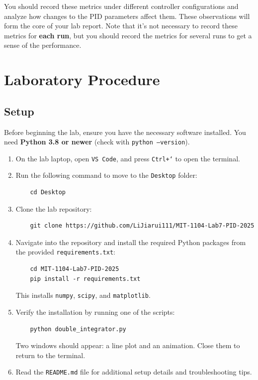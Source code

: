 \documentclass[12pt]{article}
\begin{document}
You should record these metrics under different controller configurations and analyze how changes to the PID parameters affect them.  These observations will form the core of your lab report.  Note that it's not necessary to record these metrics for \textbf{each run}, but you should record the metrics for several runs to get a sense of the performance.  

\section{Laboratory Procedure}

\subsection{Setup}
Before beginning the lab, ensure you have the necessary software installed.  You need \textbf{Python 3.8 or newer} (check with \texttt{python --version}).

\begin{enumerate}
    \item On the lab laptop, open \texttt{VS Code}, and press \texttt{Ctrl+`} to open the terminal. 
    \item Run the following command to move to the \texttt{Desktop} folder:
    \begin{verbatim}
    cd Desktop
    \end{verbatim}
    \item Clone the lab repository:
    \begin{verbatim}
    git clone https://github.com/LiJiarui111/MIT-1104-Lab7-PID-2025
    \end{verbatim}
    \item Navigate into the repository and install the required Python packages from the provided \texttt{requirements.txt}:
    \begin{verbatim}
    cd MIT-1104-Lab7-PID-2025
    pip install -r requirements.txt
    \end{verbatim}
    This installs \texttt{numpy}, \texttt{scipy}, and \texttt{matplotlib}.
    \item Verify the installation by running one of the scripts:
    \begin{verbatim}
    python double_integrator.py
    \end{verbatim}
    Two windows should appear: a line plot and an animation.  Close them to return to the terminal.
    \item Read the \texttt{README.md} file for additional setup details and troubleshooting tips.
\end{enumerate}
\end{document}
